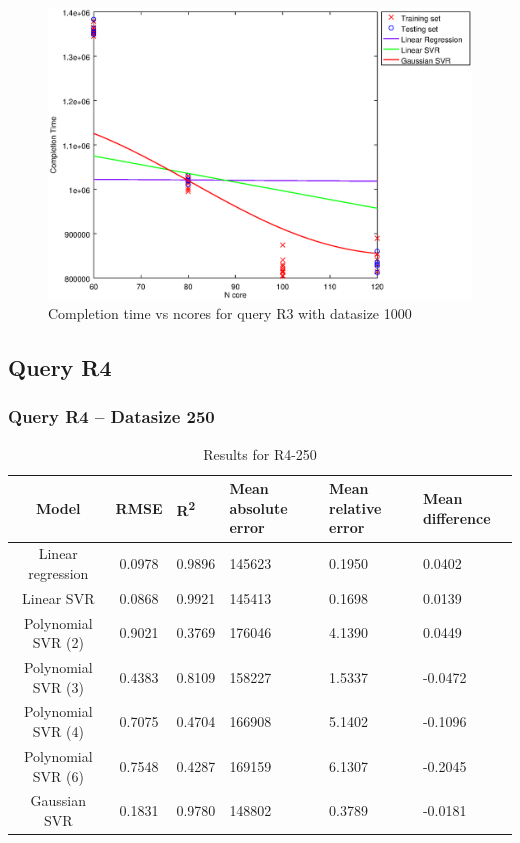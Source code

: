 \documentclass[a4paper,11pt]{article}
\begin{document}
\begin {figure}[hbtp]
\centering
\includegraphics[width=\textwidth]{output/R3_1000_LINEAR_NCORE/plot_R3_1000_bestmodels.eps}
\caption{Completion time vs ncores for query R3 with datasize 1000}
\label{fig:all_linear_R3_1000}
\end {figure}

\newpage
\subsection{Query R4}
\subsubsection{Query R4 -- Datasize 250}
\begin{table}[H]
	\centering
	\begin{adjustbox}{center}
		\begin{tabular}{c | c M{1.2cm} M{2.5cm} M{2.5cm} M{1.8cm}}
			Model & RMSE & R\textsuperscript{2} & Mean absolute error & Mean relative error & Mean difference \tabularnewline
			\hline
			Linear regression & 0.0978 & 0.9896 & 145623 & 0.1950 & 0.0402 \\
			Linear SVR & 0.0868 & 0.9921 & 145413 & 0.1698 & 0.0139 \\
			Polynomial SVR (2) & 0.9021 & 0.3769 & 176046 & 4.1390 & 0.0449 \\
			Polynomial SVR (3) & 0.4383 & 0.8109 & 158227 & 1.5337 & -0.0472 \\
			Polynomial SVR (4) & 0.7075 & 0.4704 & 166908 & 5.1402 & -0.1096 \\
			Polynomial SVR (6) & 0.7548 & 0.4287 & 169159 & 6.1307 & -0.2045 \\
			Gaussian SVR & 0.1831 & 0.9780 & 148802 & 0.3789 & -0.0181 \\
		\end{tabular}
	\end{adjustbox}
	\\
	\caption{Results for R4-250}
	\label{fig:all_linear_R4_250}
\end{table}
\end{document}
